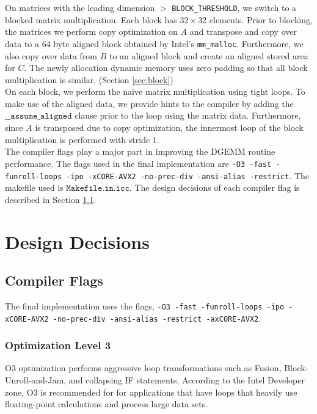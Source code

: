 \documentclass[11pt]{article}
\begin{document}
On matrices with the leading dimension $>$ \texttt{BLOCK\_THRESHOLD}, we switch to a blocked matrix multiplication. Each block has $32 \times 32$ elements. Prior to blocking, the matrices we perform copy optimization on $A$ and transpose and copy over data to a 64 byte aligned block obtained by Intel's \texttt{mm\_malloc}. Furthermore, we also copy over data from $B$ to an aligned block and create an aligned stored area for $C$. The newly allocation dynamic memory uses zero padding so that all block multiplication is similar. (Section \ref{sec:block}) \\

On each block, we perform the naive matrix multiplication using tight loops. To make use of the aligned data, we provide hints to the compiler by adding the $\texttt{\_\_assume\_aligned}$ clause prior to the loop using the matrix data. \cite{vectorization} Furthermore, since $A$ is transposed due to copy optimization, the innermost loop of the block multiplication is performed with stride 1. \\

The compiler flags play a major part in improving the DGEMM routine performance. The flags used in the final implementation are \texttt{-O3 -fast -funroll-loops -ipo -xCORE-AVX2 -no-prec-div -ansi-alias -restrict}. The makefile used is $\texttt{Makefile.in.icc}$. The design decisions of each compiler flag is described in Section \ref{sec:comp_flags}.

\section{Design Decisions}
\subsection{Compiler Flags}\label{sec:comp_flags}

The final implementation uses the flags, \texttt{-O3 -fast -funroll-loops -ipo -xCORE-AVX2 -no-prec-div -ansi-alias -restrict -axCORE-AVX2}.
\subsubsection{Optimization Level 3}
O3 optimization performs aggressive loop transformations such as Fusion, Block-Unroll-and-Jam, and collapsing IF statements. According to the Intel Developer zone, \cite{stepbystep} O3 is recommended for for applications that have loops that heavily use floating-point calculations and process large data sets.
\end{document}
